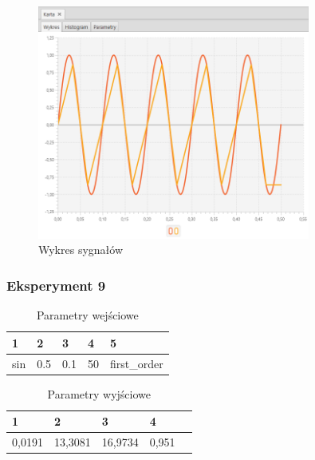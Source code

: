 \documentclass[12pt]{article}
\begin{document}
{{{                \begin{figure}[H]
                    \centering
                    \includegraphics[width=0.8\textwidth]{img/result/experiment1/08/data_draw_original_chart_recon_output_130245.png}
                    \caption{Wykres sygnałów}
                \end{figure}
            }
            \newpage

            \subsubsection{Eksperyment 9} {
                \begin{table}[H]
                    \centering
                    \begin{tabular}{|l|l|l|l|l|}
                        \hline
                        1 & 2 & 3 & 4 & 5   \\ \hline
                        sin & 0.5 & 0.1 & 50 & first\_order   \\ \hline
                    \end{tabular}
                    \caption{Parametry wejściowe}
                \end{table}

                \begin{table}[H]
                    \centering
                    \begin{tabular}{|l|l|l|l|l|}
                        \hline
                        1 & 2 & 3 & 4   \\ \hline
                        0,0191 & 13,3081 & 16,9734 & 0,951  \\ \hline
                    \end{tabular}
                    \caption{Parametry wyjściowe}
                \end{table}


}}}
\end{document}
